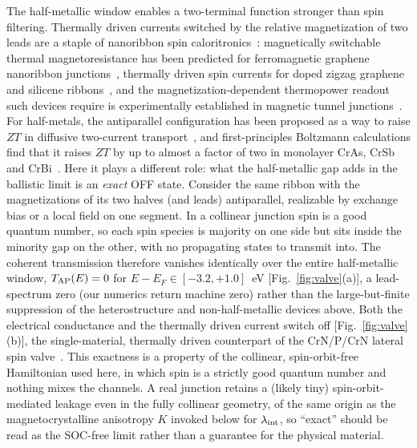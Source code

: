 \documentclass[preprint,12pt]{elsarticle}
\begin{document}
The half-metallic window enables a two-terminal function stronger than spin filtering.
Thermally driven currents switched by the relative magnetization of two leads are a staple of
nanoribbon spin caloritronics~\cite{Bauer2012}: magnetically switchable thermal
magnetoresistance has been predicted for ferromagnetic graphene nanoribbon
junctions~\cite{Zeng2011}, thermally driven spin currents for doped zigzag graphene and
silicene ribbons~\cite{Song2020,Ghanbari2018}, and the magnetization-dependent thermopower
readout such devices require is experimentally established in magnetic tunnel
junctions~\cite{Walter2011,Liebing2011}. For half-metals, the antiparallel configuration has
been proposed as a way to raise $ZT$ in diffusive two-current transport~\cite{Cahaya2015}, and
first-principles Boltzmann calculations find that it raises $ZT$ by up to almost a factor of two
in monolayer CrAs, CrSb and CrBi~\cite{Muntini2022}. Here it plays a different role: what the
half-metallic gap adds in the ballistic limit is an \emph{exact} OFF state. Consider the same ribbon with the magnetizations of its two halves (and leads)
antiparallel, realizable by exchange bias or a local field on one segment. In a collinear
junction spin is a good quantum number, so each spin species is majority on one side but sits
inside the minority gap on the other, with no propagating states to transmit into. The
coherent transmission therefore vanishes identically over the entire half-metallic window,
$T_{\rm AP}(E)=0$ for $E-E_F\in[-3.2,+1.0]$~eV [Fig.~\ref{fig:valve}(a)], a lead-spectrum
zero (our numerics return machine zero) rather than the large-but-finite suppression of the
heterostructure and non-half-metallic devices above. Both the electrical conductance and the
thermally driven current switch off [Fig.~\ref{fig:valve}(b)], the single-material,
thermally driven counterpart of the CrN/P/CrN lateral spin valve~\cite{Modarresi2019}. This
exactness is a property of the collinear, spin-orbit-free Hamiltonian used here, in which spin
is a strictly good quantum number and nothing mixes the channels. A real junction retains a
(likely tiny) spin-orbit-mediated leakage even in the fully collinear geometry, of the same
origin as the magnetocrystalline anisotropy $K$ invoked below for $\lambda_{\rm int}$, so
``exact'' should be read as the SOC-free limit rather than a guarantee for the physical material.
\end{document}
